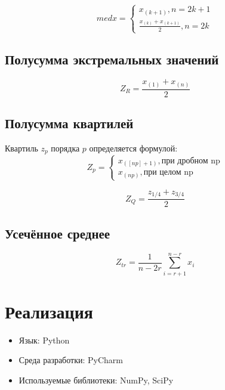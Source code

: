 \begin{equation} 
med x = \begin{cases}
   x_{(k+1)}, n = 2k+1\\
   \frac{x_{(k)} + x_{(k+1)}}{2}, n = 2k
 \end{cases}
\end{equation}


\subsection{Полусумма экстремальных значений}

\begin{equation} 
Z_{R} = \frac{x_{(1)} + x_{(n)}}{2}
\end{equation}


\subsection{Полусумма квартилей}

Квартиль \(z_p\) порядка \(p\) определяется формулой:
\begin{equation} 
Z_{p} = \begin{cases}
   x_{([np] + 1)}, \text{при дробном np}\\
   x_{(np)}, \text{при целом np}
 \end{cases}
\end{equation}

\begin{equation} 
Z_{Q} = \frac{z_{1/4} + z_{3/4}}{2}
\end{equation}


\subsection{Усечённое среднее}

\begin{equation} 
Z_{tr} = \frac{1}{n-2r}\sum_{i=r+1}^{n-r} x_{i}
\end{equation}


\section{Реализация}
\begin{itemize}
\item Язык: Python
\item Среда разработки: PyCharm
\item Используемые библиотеки: NumPy, SciPy
\end{itemize}


